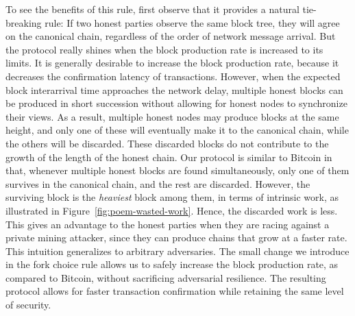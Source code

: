 To see the benefits of this rule, first observe that it provides a natural tie-breaking rule:
If two honest parties observe the same block tree, they will agree on
the canonical chain, regardless of the order of network message arrival. But the protocol
really shines when the block production rate is increased to its limits. It is generally desirable
to increase the block production rate, because it decreases the confirmation latency of transactions.
However, when the expected block interarrival time approaches the network delay, multiple honest blocks
can be produced in short succession without allowing for honest nodes to synchronize their views.
As a result, multiple honest nodes may produce blocks at the same height, and only one of these will
eventually make it to the canonical chain, while the others will be discarded. These discarded blocks
do not contribute to the growth of the length of the honest chain. Our protocol is similar to Bitcoin in that,
whenever multiple honest blocks are found simultaneously, only one of them survives in the canonical chain,
and the rest are discarded. However, the surviving block is the \emph{heaviest} block among them, in terms of intrinsic
work, as illustrated in Figure~\ref{fig:poem-wasted-work}. Hence, the discarded
work is less. This gives an advantage to the honest
parties when they are racing against a private mining attacker, since they can produce chains that grow
at a faster rate. This intuition generalizes to arbitrary adversaries.
The small change we introduce in the fork choice rule allows us to safely increase the block production
rate, as compared to Bitcoin, without sacrificing adversarial resilience. The resulting protocol
allows for faster transaction confirmation while retaining the same level of security.

